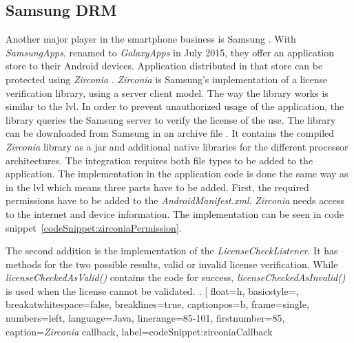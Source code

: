 \subsection{Samsung DRM} \label{section:license-samsung}
Another major player in the smartphone business is Samsung \cite{comscoreMarket}.
With \textit{SamsungApps}, renamed to \textit{GalaxyApps} in July 2015, they offer an application store to their Android devices.
Application distributed in that store can be protected using \textit{Zirconia} \cite{samsungZirconia}.
\textit{Zirconia} is Samsung’s implementation of a license verification library, using a server client model.
\newline
The way the library works is similar to the \gls{lvl}.
In order to prevent unauthorized usage of the application, the library queries the Samsung server to verify the license of the use.
The library can be downloaded from Samsung in an archive file \cite{samsungZirconia}.
It contains the compiled \textit{Zirconia} library as a \gls{jar} and additional native libraries for the different processor architectures.
The integration requires both file types to be added to the application.
The implementation in the application code is done the same way as in the \gls{lvl} which means three parts have to be added.
\newline
First, the required permissions have to be added to the \textit{AndroidManifest.xml}.
\textit{Zirconia} needs access to the internet and device information.
The implementation can be seen in code snippet~\ref{codeSnippet:zirconiaPermission}.
\newline

The second addition is the implementation of the \textit{LicenseCheckListener}.
It has methods for the two possible results, valid or invalid license verification.
While \textit{licenseCheckedAsValid()} contains the code for success, \textit{licenseCheckedAsInvalid()} is used when the license cannot be validated.
\textit.
[
  float=h,
  basicstyle=\footnotesize,
  breakatwhitespace=false,
  breaklines=true,
  captionpos=b,
  frame=single,
  numbers=left,
  language=Java,
  linerange={85-101},
  firstnumber=85,
  caption={\textit{Zirconia} callback},
  label={codeSnippet:zirconiaCallback}
